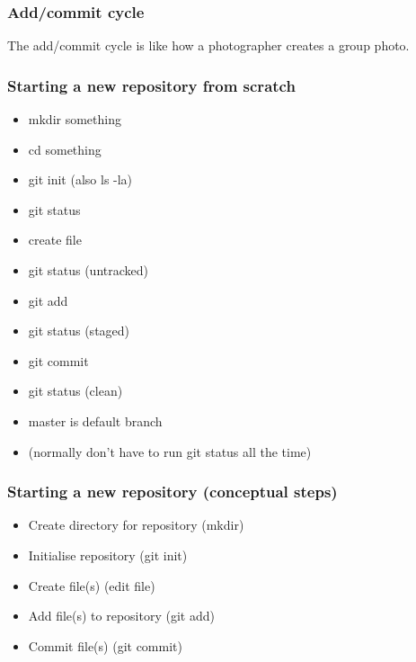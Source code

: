 \begin{frame}
\frametitle{Add/commit cycle}
The add/commit cycle is like how a photographer creates a group photo.
\end{frame}


\begin{frame}
\frametitle{Starting a new repository from scratch}
\begin{itemize}
    \item mkdir something
    \item cd something
    \item git init  (also ls -la)
    \item git status
    \item create file
    \item git status (untracked)
    \item git add
    \item git status (staged)
    \item git commit
    \item git status (clean)
    \item master is default branch
    \item (normally don't have to run git status all the time)
\end{itemize}
\end{frame}

\begin{frame}
    \frametitle{Starting a new repository (conceptual steps)}
    \begin{itemize}
        \item Create directory for repository (mkdir)
        \item Initialise repository (git init)
        \item Create file(s) (edit file)
        \item Add file(s) to repository (git add)
        \item Commit file(s) (git commit)
    \end{itemize}
\end{frame}


